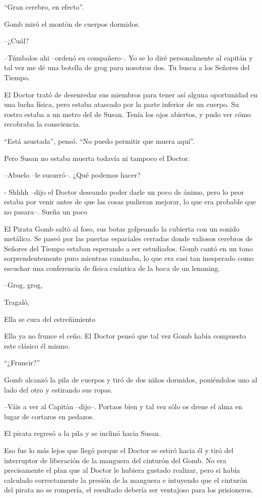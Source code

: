 ``Gran cerebro, en efecto''.

Gomb miró el montón de cuerpos dormidos. 

--¿Cuál?

--Túmbalos ahi --ordenó su compañero--. Yo se lo diré personalmente al capitán y tal vez me dé una botella de grog para nosotros dos. Tu busca a los Señores del Tiempo.

El Doctor trató de desenredar sus miembros para tener así alguna oportunidad en una lucha física, pero estaba atascado por la parte inferior de un cuerpo. Su rostro estaba a un metro del de Susan. Tenía los ojos abiertos, y pudo ver cómo recobraba la consciencia.

``Está asustada'', pensó. ``No puedo permitir que muera aquí''.

Pero Susan no estaba muerta todavía ni tampoco el Doctor.

--Abuelo --le susurró--. ¿Qué podemos hacer?

- Shhhh --dijo el Doctor deseando poder darle un poco de ánimo, pero lo peor estaba por venir antes de que las cosas pudieran mejorar, lo que era probable que no pasara--. Sueña un poco

El Pirata Gomb saltó al foso, sus botas golpeando la cubierta con un sonido metálico. Se paseó por las puertas espaciales cerradas donde valiosos cerebros de Señores del Tiempo estaban esperando a ser estudiados. Gomb cantó en un tono sorprendentemente puro mientras caminaba, lo que era casi tan inesperado como escuchar una conferencia de física cuántica de la boca de un lemming.

--Grog, grog,

Tragaló,

Ella se cura del estreñimiento

Ella ya no frunce el ceño.
El Doctor pensó que tal vez Gomb había compuesto este clásico él mismo.

``¿Fruncir?''

Gomb alcanzó la pila de cuerpos y tiró de dos niños dormidos, poniéndolos uno al lado del otro y estirando sus ropas.

--Váis a ver al Capitán --dijo--. Portaos bien y tal vez sólo os drene el alma en lugar de cortaros en pedazos.

El pirata regresó a la pila y se inclinó hacia Susan.

Eso fue lo más lejos que llegó porque el Doctor se estiró hacia él y tiró del interruptor de liberación de la manguera del cinturón del Gomb. No era precisamente el plan que al Doctor le hubiera gustado realizar, pero si había calculado correctamente la presión de la manguera e intuyendo que el cinturón del pirata no se rompería, el resultado debería ser ventajoso para los prisioneros.


